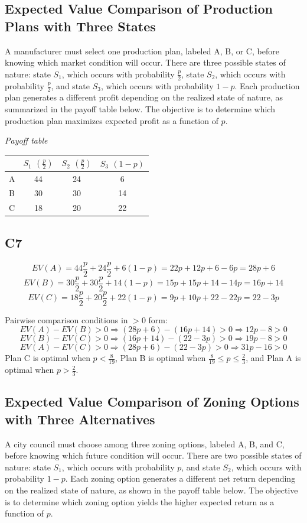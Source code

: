 \begin{ExamProblems}
		\subsection*{Expected Value Comparison of Production Plans with Three States}
		A manufacturer must select one production plan, labeled A, B, or C, before knowing which market condition will occur.
		There are three possible states of nature: state $S_1$, which occurs with probability $\frac{p}{2}$,
		state $S_2$, which occurs with probability $\frac{p}{2}$, and state $S_3$, which occurs with probability $1-p$.
		Each production plan generates a different profit depending on the realized state of nature, as summarized in the payoff table below.
		The objective is to determine which production plan maximizes expected profit as a function of $p$.
		
		\begin{center}
			\textit{Payoff table} \\
			\begin{tabular}{l c c c}
				\toprule
				& $S_1$ $\left(\frac{p}{2}\right)$ & $S_2$ $\left(\frac{p}{2}\right)$ & $S_3$ $(1-p)$ \\
				\midrule
				A & 44 & 24 & 6 \\
				B & 30 & 30 & 14 \\
				C & 18 & 20 & 22 \\
				\bottomrule
			\end{tabular}
		\end{center}
		
		\subsection*{C7}
		\[
		EV(A)=44\frac{p}{2}+24\frac{p}{2}+6(1-p)=22p+12p+6-6p=28p+6
		\]
		\[
		EV(B)=30\frac{p}{2}+30\frac{p}{2}+14(1-p)=15p+15p+14-14p=16p+14
		\]
		\[
		EV(C)=18\frac{p}{2}+20\frac{p}{2}+22(1-p)=9p+10p+22-22p=22-3p
		\]
		
		Pairwise comparison conditions in $>0$ form:
		\[
		EV(A)-EV(B)>0 \Rightarrow (28p+6)-(16p+14)>0 \Rightarrow 12p-8>0
		\]
		\[
		EV(B)-EV(C)>0 \Rightarrow (16p+14)-(22-3p)>0 \Rightarrow 19p-8>0
		\]
		\[
		EV(A)-EV(C)>0 \Rightarrow (28p+6)-(22-3p)>0 \Rightarrow 31p-16>0
		\]
		Plan C is optimal when $p<\frac{8}{19}$, Plan B is optimal when $\frac{8}{19} \le p \le \frac{2}{3}$,
		and Plan A is optimal when $p>\frac{2}{3}$.
		
		\item
		\subsection*{Expected Value Comparison of Zoning Options with Three Alternatives}
		A city council must choose among three zoning options, labeled A, B, and C, before knowing which future condition will occur.
		There are two possible states of nature: state $S_1$, which occurs with probability $p$, and state $S_2$, which occurs with probability $1-p$.
		Each zoning option generates a different net return depending on the realized state of nature, as shown in the payoff table below.
		The objective is to determine which zoning option yields the higher expected return as a function of $p$.
		

\end{ExamProblems}
